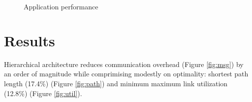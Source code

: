 \documentclass[a0,portrait]{a0poster}
\begin{document}
\begin{multicols}{2}
\begin{figure}[H]
  \begin{center}  
  \end{center}
\caption{Application performance}
\end{figure}

\section*{Results}
Hierarchical architecture reduces communication overhead (Figure \ref{fig:msg}) by an order of magnitude while comprimising modestly on optimality: shortest path length (17.4\%) (Figure \ref{fig:path}) and minimum maximum link utilization (12.8\%) (Figure \ref{fig:util}).


\end{multicols}
\end{document}
